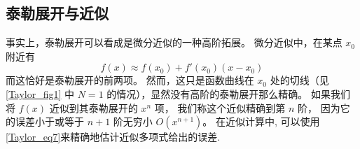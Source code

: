 \subsection{泰勒展开与近似}
事实上，泰勒展开可以看成是微分近似的一种高阶拓展。 微分近似中，在某点 $x_0$ 附近有
\begin{equation}
f(x) \approx f(x_0) + f'(x_0)(x - x_0)
\end{equation}
而这恰好是泰勒展开的前两项。 然而，这只是函数曲线在 $x_0$ 处的切线（见\autoref{Taylor_fig1} 中 $N=1$ 的情况），显然没有高阶的泰勒展开那么精确。 如果我们将 $f(x)$ 近似到其泰勒展开的 $x^n$ 项， 我们称这个近似精确到第 $n$ 阶， 因为它的误差小于或等于 $n + 1$ 阶无穷小 $O(x^{n + 1})$。 在近似计算中, 可以使用\autoref{Taylor_eq7}来精确地估计近似多项式给出的误差. 